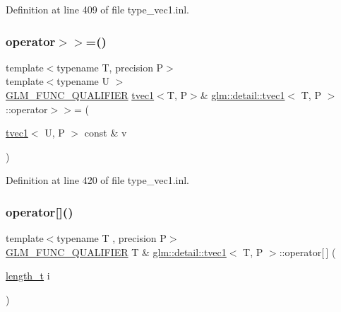 Definition at line 409 of file type\+\_\+vec1.\+inl.

\mbox{\label{structglm_1_1detail_1_1tvec1_a6867d5e71d657b7d5498979ab8d8f1cf}} 
\subsubsection{\texorpdfstring{operator$>$$>$=()}{operator>>=()}\hspace{0.1cm}{\footnotesize\ttfamily [4/4]}}
{\footnotesize\ttfamily template$<$typename T, precision P$>$ \\
template$<$typename U $>$ \\
\hyperlink{setup_8hpp_a33fdea6f91c5f834105f7415e2a64407}{G\+L\+M\+\_\+\+F\+U\+N\+C\+\_\+\+Q\+U\+A\+L\+I\+F\+I\+ER} \hyperlink{structglm_1_1detail_1_1tvec1}{tvec1}$<$T, P$>$\& \hyperlink{structglm_1_1detail_1_1tvec1}{glm\+::detail\+::tvec1}$<$ T, P $>$\+::operator$>$$>$= (\begin{DoxyParamCaption}\item[{\hyperlink{structglm_1_1detail_1_1tvec1}{tvec1}$<$ U, P $>$ const \&}]{v }\end{DoxyParamCaption})}



Definition at line 420 of file type\+\_\+vec1.\+inl.

\mbox{\label{structglm_1_1detail_1_1tvec1_adb575b50f9ef01bf4a6a4ecdfb82ac59}} 
\subsubsection{\texorpdfstring{operator[]()}{operator[]()}\hspace{0.1cm}{\footnotesize\ttfamily [1/2]}}
{\footnotesize\ttfamily template$<$typename T , precision P$>$ \\
\hyperlink{setup_8hpp_a33fdea6f91c5f834105f7415e2a64407}{G\+L\+M\+\_\+\+F\+U\+N\+C\+\_\+\+Q\+U\+A\+L\+I\+F\+I\+ER} T \& \hyperlink{structglm_1_1detail_1_1tvec1}{glm\+::detail\+::tvec1}$<$ T, P $>$\+::operator\mbox{[}$\,$\mbox{]} (\begin{DoxyParamCaption}\item[{\hyperlink{namespaceglm_a090a0de2260835bee80e71a702492ed9}{length\+\_\+t}}]{i }\end{DoxyParamCaption})}



